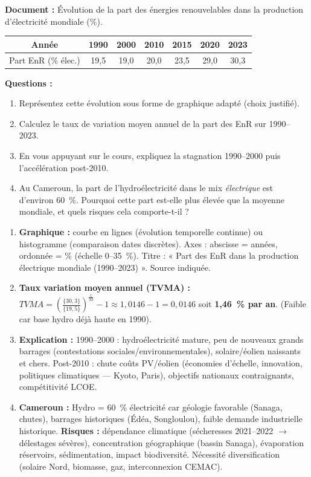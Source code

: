 \documentclass[11pt]{article}
\begin{document}
\begin{exercice}
\textbf{Document :} Évolution de la part des énergies renouvelables dans la production d'électricité mondiale (\%).
\begin{center}
\begin{tabular}{|c|c|c|c|c|c|c|}\hline
Année & 1990 & 2000 & 2010 & 2015 & 2020 & 2023 \\ \hline
Part EnR (\% élec.) & 19,5 & 19,0 & 20,0 & 23,5 & 29,0 & 30,3 \\ \hline
\end{tabular}
\end{center}
\textbf{Questions :}
\begin{enumerate}
    \item Représentez cette évolution sous forme de graphique adapté (choix justifié).
    \item Calculez le taux de variation moyen annuel de la part des EnR sur 1990–2023.
    \item En vous appuyant sur le cours, expliquez la stagnation 1990–2000 puis l'accélération post-2010.
    \item Au Cameroun, la part de l'hydroélectricité dans le mix \emph{électrique} est d'environ 60~\%. Pourquoi cette part est-elle plus élevée que la moyenne mondiale, et quels risques cela comporte-t-il ?
\end{enumerate}
\end{exercice}

\begin{corrige}[Exercice n°1]
\begin{enumerate}
    \item \textbf{Graphique :} courbe en lignes (évolution temporelle continue) ou histogramme (comparaison dates discrètes). Axes : abscisse = années, ordonnée = \% (échelle 0–35~\%). Titre : « Part des EnR dans la production électrique mondiale (1990–2023) ». Source indiquée.
    \item \textbf{Taux variation moyen annuel (TVMA) :} $TVMA = \left(\frac{\{30,3\}}{\{19,5\}}\right)^{\frac{1}{33}} - 1 \approx 1,0146 - 1 = 0,0146$ soit \textbf{1,46~\% par an}. (Faible car base hydro déjà haute en 1990).
    \item \textbf{Explication :} 1990–2000 : hydroélectricité mature, peu de nouveaux grands barrages (contestations sociales/environnementales), solaire/éolien naissants et chers. Post-2010 : chute coûts PV/éolien (économies d'échelle, innovation, politiques climatiques — Kyoto, Paris), objectifs nationaux contraignants, compétitivité LCOE.
    \item \textbf{Cameroun :} Hydro = 60~\% électricité car géologie favorable (Sanaga, chutes), barrages historiques (Édéa, Songloulou), faible demande industrielle historique. \textbf{Risques :} dépendance climatique (sécheresses 2021–2022 $\to$ délestages sévères), concentration géographique (bassin Sanaga), évaporation réservoirs, sédimentation, impact biodiversité. Nécessité diversification (solaire Nord, biomasse, gaz, interconnexion CEMAC).
\end{enumerate}
\end{corrige}
\end{document}
